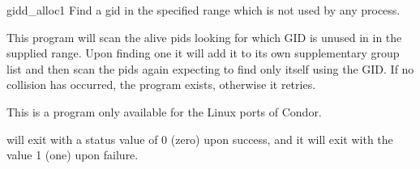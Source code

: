 \begin{ManPage}{\label{man-gidd-alloc}gidd\_alloc}{1}
{Find a gid in the specified range which is not used by any process.}
\Synopsis {}


\Description 

This program will scan the alive pids looking for which GID is unused in
in the supplied range. Upon finding one it will add it to its own supplementary
group list and then scan the pids again expecting to find only itself using
the GID. If no collision has occurred, the program exists, otherwise it
retries.

\begin{Options}

	
\end{Options}
	
\GenRem

This is a program only available for the Linux ports of Condor.

\ExitStatus

 will exit with a status value of 0 (zero) upon success,
and it will exit with the value 1 (one) upon failure.

\end{ManPage}
